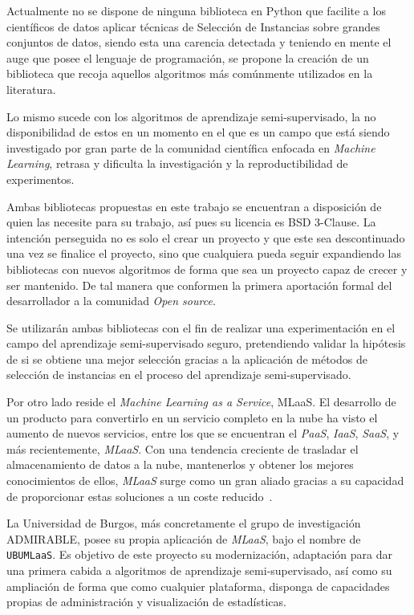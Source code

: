 
Actualmente no se dispone de ninguna biblioteca en Python que facilite a los científicos de datos aplicar técnicas de Selección de Instancias sobre grandes conjuntos de datos, siendo esta una carencia detectada y teniendo en mente el auge que posee el lenguaje de programación, se propone la creación de un biblioteca que recoja aquellos algoritmos más comúnmente utilizados en la literatura. 

Lo mismo sucede con los algoritmos de aprendizaje semi-supervisado, la no disponibilidad de estos en un momento en el que es un campo que está siendo investigado por gran parte de la comunidad científica enfocada en \textit{Machine Learning}, retrasa y dificulta la investigación y la reproductibilidad de experimentos.

Ambas bibliotecas propuestas en este trabajo se encuentran a disposición de quien las necesite para su trabajo, así pues su licencia es BSD 3-Clause. La intención perseguida no es solo el crear un proyecto y que este sea descontinuado una vez se finalice el proyecto, sino que cualquiera pueda seguir expandiendo las bibliotecas con nuevos algoritmos de forma que sea un proyecto capaz de crecer y ser mantenido. De tal manera que conformen la primera aportación formal del desarrollador a la comunidad \textit{Open source}.

Se utilizarán ambas bibliotecas con el fin de realizar una experimentación en el campo del aprendizaje semi-supervisado seguro, pretendiendo validar la hipótesis de si se obtiene una mejor selección gracias a la aplicación de métodos de selección de instancias en el proceso del aprendizaje semi-supervisado. 

Por otro lado reside el \textit{Machine Learning as a Service}, MLaaS. El desarrollo de un producto para convertirlo en un servicio completo en la nube ha visto el aumento de nuevos servicios, entre los que se encuentran el \textit{PaaS}, \textit{IaaS}, \textit{SaaS}, y más recientemente, \textit{MLaaS}. Con una tendencia creciente de trasladar el almacenamiento de datos a la nube, mantenerlos y obtener los mejores conocimientos de ellos, \textit{MLaaS} surge como un gran aliado gracias a su capacidad de proporcionar estas soluciones a un coste reducido~\cite{whatismlaas}.

La Universidad de Burgos, más concretamente el grupo de investigación ADMIRABLE, posee su propia aplicación de \textit{MLaaS}, bajo el nombre de \texttt{UBUMLaaS}. Es objetivo de este proyecto su modernización, adaptación para dar una primera cabida a algoritmos de aprendizaje semi-supervisado, así como su ampliación de forma que como cualquier plataforma, disponga de capacidades propias de administración y visualización de estadísticas.


